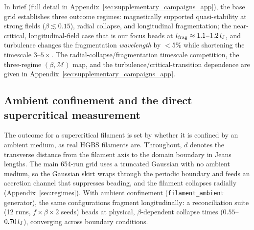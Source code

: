 \documentclass[usenatbib,twoside,twocolumn]{mnras}
\begin{document}
In brief (full detail in Appendix~\ref{sec:supplementary_campaigns_app}), the base grid establishes three outcome regimes: magnetically supported quasi-stability at strong fields ($\beta\lesssim0.15$), radial collapse, and longitudinal fragmentation; the near-critical, longitudinal-field case that is our focus beads at $t_{\rm frag}\approx1.1$--$1.2\,t_{\rm J}$, and turbulence changes the fragmentation \emph{wavelength} by $<5\%$ while shortening the timescale $3$--$5\times$. The radial-collapse/fragmentation timescale competition, the three-regime $(\beta,\mathcal{M})$ map, and the turbulence/critical-transition dependence are given in Appendix~\ref{sec:supplementary_campaigns_app}.


\subsection{Ambient confinement and the direct supercritical measurement}
\label{sec:modecompetition}

The outcome for a supercritical filament is set by whether it is confined by an ambient medium, as real HGBS filaments are. Throughout, $d$ denotes the transverse distance from the filament axis to the domain boundary in Jeans lengths. The main 654-run grid uses a truncated Gaussian with no ambient medium, so the Gaussian skirt wraps through the periodic boundary and feeds an accretion channel that suppresses beading, and the filament collapses radially (Appendix~\ref{sec:regimes}). With ambient confinement (\texttt{filament\_ambient} generator), the same configurations fragment longitudinally: a reconciliation suite (12 runs, $f\times\beta\times2$ seeds) beads at physical, $\beta$-dependent collapse times ($0.55$--$0.70\,t_{\rm J}$), converging across boundary conditions.
\end{document}
